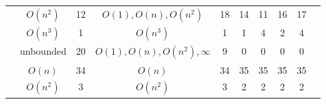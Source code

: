 \begin{table}[ht]
{\begin{tabular}{ >{\scriptsize}c | >{\scriptsize}c | >{\scriptsize}c | >{\scriptsize}c | c | c | c | c | c | c }
        \cline{2-9}
        & $O(n^2)$     & 12     &   $O(1), O(n), O(n^2)$ & 18 & 14 & 11 & 16 & 17 \\
        \cline{2-9}
        & $O(n^3)$      &  1    &   $O(n^3)$     & 1  & 1 & 4 & 2 & 4 \\
        \cline{2-9}
        & unbounded    &  20    &   $O(1), O(n), O(n^2), \infty$  & 9  & 0 & 0 & 0 & 0 \\
        \hline \hline
        \multirow{3}{*}{Tianhan} 
        & $O(n)$       & 34     & $O(n) $ & 34 & 35 & 35 & 35 & 35 \\
        \cline{2-9}
        & $O(n^2)$      & 3    &  $O(n^2)$  & 3 & 2 & 2 & 2 & 2 \\
        \hline
        \end{tabular}
    }
\end{table}


